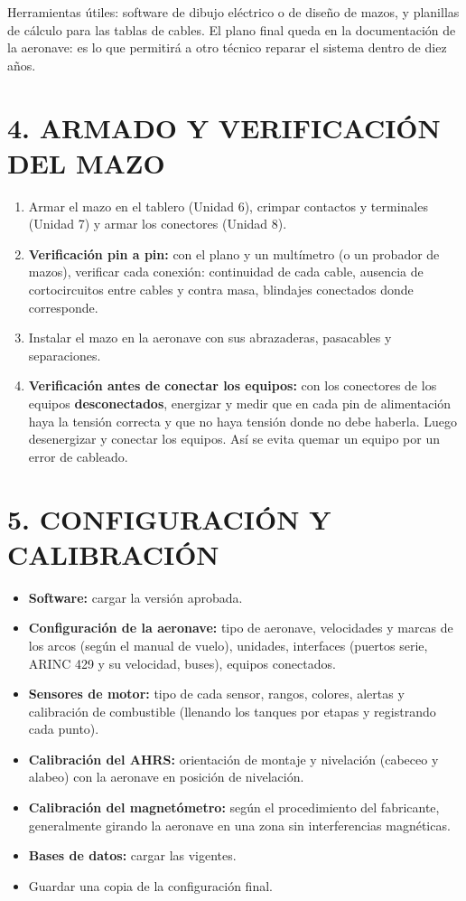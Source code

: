 Herramientas útiles: software de dibujo eléctrico o de diseño de mazos, y planillas de cálculo
para las tablas de cables. El plano final queda en la documentación de la aeronave: es lo que
permitirá a otro técnico reparar el sistema dentro de diez años.

\section*{4. ARMADO Y VERIFICACIÓN DEL MAZO}
\begin{enumerate}
  \item Armar el mazo en el tablero (Unidad 6), crimpar contactos y terminales (Unidad 7) y armar
        los conectores (Unidad 8).
  \item \textbf{Verificación pin a pin:} con el plano y un multímetro (o un probador de mazos),
        verificar cada conexión: continuidad de cada cable, ausencia de cortocircuitos entre
        cables y contra masa, blindajes conectados donde corresponde.
  \item Instalar el mazo en la aeronave con sus abrazaderas, pasacables y separaciones.
  \item \textbf{Verificación antes de conectar los equipos:} con los conectores de los equipos
        \textbf{desconectados}, energizar y medir que en cada pin de alimentación haya la tensión
        correcta y que no haya tensión donde no debe haberla. Luego desenergizar y conectar los
        equipos. Así se evita quemar un equipo por un error de cableado.
\end{enumerate}

\section*{5. CONFIGURACIÓN Y CALIBRACIÓN}
\begin{itemize}
  \item \textbf{Software:} cargar la versión aprobada.
  \item \textbf{Configuración de la aeronave:} tipo de aeronave, velocidades y marcas de los arcos
        (según el manual de vuelo), unidades, interfaces (puertos serie, ARINC 429 y su velocidad,
        buses), equipos conectados.
  \item \textbf{Sensores de motor:} tipo de cada sensor, rangos, colores, alertas y calibración de
        combustible (llenando los tanques por etapas y registrando cada punto).
  \item \textbf{Calibración del AHRS:} orientación de montaje y nivelación (cabeceo y alabeo) con la
        aeronave en posición de nivelación.
  \item \textbf{Calibración del magnetómetro:} según el procedimiento del fabricante, generalmente
        girando la aeronave en una zona sin interferencias magnéticas.
  \item \textbf{Bases de datos:} cargar las vigentes.
  \item Guardar una copia de la configuración final.
\end{itemize}

